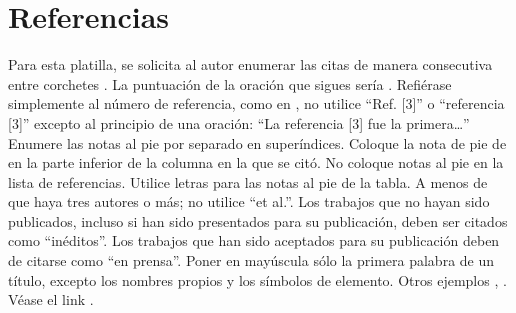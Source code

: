     \section*{Referencias}
    
    
    Para esta platilla, se solicita al autor enumerar las citas de manera consecutiva entre corchetes \cite{YLi2013}. 
    La puntuación de la oración que sigues sería \cite{Mesaelides2011}. 
    Refiérase simplemente al número de referencia, como en \cite{Morales2012}, no utilice “Ref. [3]” o “referencia [3]” excepto al principio de una oración: “La referencia [3] fue la primera…”
    Enumere las notas al pie por separado en superíndices. Coloque la nota de pie de en la parte inferior de la columna en la que se citó. No coloque notas al pie en la lista de referencias. Utilice letras para las notas al pie de la tabla.
    A menos de que haya tres autores o más; no utilice “et al.”. Los trabajos que no hayan sido publicados, incluso si han sido presentados para su publicación, deben ser citados como “inéditos”. Los trabajos que han sido aceptados para su publicación deben de citarse como “en prensa”. Poner en mayúscula sólo la primera palabra de un título, excepto los nombres propios y los símbolos de elemento. 
    Otros ejemplos \cite{LAAngeles2021}, \cite{LAAngelesConni}. 
    Véase el link \cite{prueba}.
    
    
    
    
    
    
    
